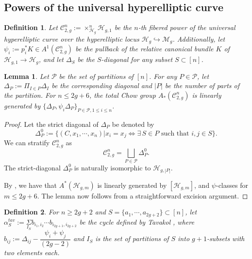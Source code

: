 \documentclass[11pt]{amsart}
\newtheorem{definition}{Definition}[subsection]
\newtheorem{lemma}[theorem]{Lemma}
\theoremstyle{definition}
\newcommand{\ri}{\rightarrow}
\newcommand{\m}{\mathcal{M}}
\newcommand{\h}{\mathcal{H}}
\newcommand{\mC}{\mathcal{C}}
\newcommand{\hr}{\hookrightarrow}
\begin{document}
\subsection{Powers of the universal hyperelliptic curve}
\begin{definition}
    Let $\mC_{2,g}^n:= \times_{\h_g}^n\h_{g,1}$ be the $n$-th fibered power of the universal hyperelliptic curve over the hyperelliptic locus $\h_g\hr \m_g$. 
    Additionally, let $\psi_i:= p_i^*K\in A^1(\mC_{2,g}^n)$ be the pullback of the relative canonical bundle $K$ of $\h_{g,1}\ri \h_g$, and let $\Delta_S$ be the $S$-diagonal for any subset $S\subset [n]$. 
\end{definition}
\begin{lemma}\label{lem:gens}
    Let $\mathcal{P}$ be the set of partitions of $[n]$. For any $P\in \mathcal{P}$, let $\Delta_P:= \Pi_{I\in P}\Delta_I$ be the corresponding diagonal and $|P|$ be the number of parts of the partition. 
    For $n\leq 2g+6$, the total Chow group $A_*(\mC_{2,g}^n)$ is linearly generated by $\{\Delta_P, \psi_i\Delta_P\}_{P\in\mathcal{P},1\leq i\leq n}$.
\end{lemma}
\begin{proof}
  Let the strict diagonal of $\Delta_P$ be denoted by 
  $$\Delta_P^0:=\{(C,x_1,\cdots,x_n)|x_i=x_j \iff \exists\, S\in P \text{ such that } i,j\in S\}.$$
We can stratify $\mC_{2,g}^n$ as
$$\mC_{2,g}^n = \bigsqcup_{P\in \mathcal{P}} \Delta_P^0.$$
The strict-diagonal $\Delta_P^0$ is naturally isomorphic to $\h_{g,|P|}$. 

By \cite[Corollary 1.5]{cl-hyp}, we have that $A^*(\h_{g,m})$ is linearly generated by $[\h_{g,m}]$, and $\psi$-classes for $m\leq 2g+6$. 
The lemma now follows from a straightforward excision argument.
\end{proof}
\begin{definition}
    For $n\geq 2g+2$ and $S=\{a_1,\cdots,a_{2g+2}\}\subset [n]$, let $\alpha_S^{tav} := \underset{I_S}{\Sigma} b_{i_1,i_2}\cdots b_{i_{2g+1},i_{2g+2}}$ be the cycle defined by Tavakol \cite[(2)]{mehdi}, where $b_{ij}:= \Delta_{ij}-\dfrac{\psi_i+\psi_j}{(2g-2)}$ and $I_S$ is the set of partitions of $S$ into $g+1$-subsets with two elements each.
\end{definition}
\end{document}
